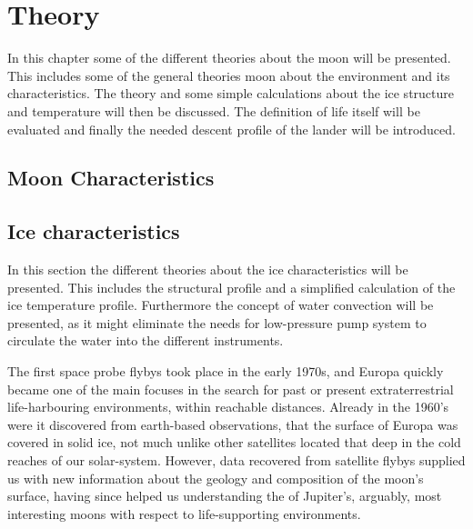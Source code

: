 \chapter{Theory}

In this chapter some of the different theories about the moon will be presented. This includes some of the general theories moon about the environment and its characteristics. The theory and some simple calculations about the ice structure and temperature will then be discussed. The definition of life itself will be evaluated and finally the needed descent profile of the lander will be introduced.

\section{Moon Characteristics} %

\section{Ice characteristics}

In this section the different theories about the ice characteristics will be presented. This includes the structural profile and a simplified calculation of the ice temperature profile. Furthermore the concept of water convection will be presented, as it might eliminate the needs for low-pressure pump system to circulate the water into the different instruments.



\label{sec:structural_profile}

The first space probe flybys took place in the early 1970s, and Europa quickly became one of the main focuses in the search for past or present extraterrestrial life-harbouring environments, within reachable distances. Already in the 1960's were it discovered from earth-based observations, that the surface of Europa was covered in solid ice, not much unlike other satellites located that deep in the cold reaches of our solar-system. However, data recovered from satellite flybys supplied us with new information about the geology and composition of the moon's surface, having since helped us understanding the of Jupiter's, arguably, most interesting moons with respect to life-supporting environments.
